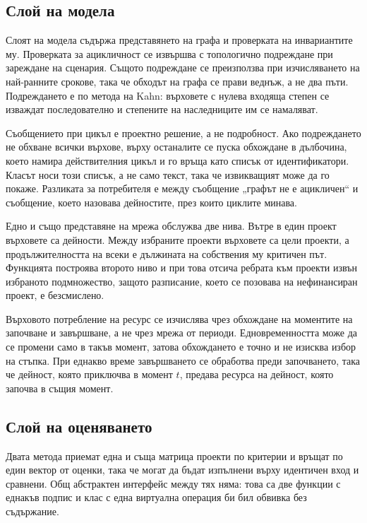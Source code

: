\subsection{Слой на модела}

Слоят на модела съдържа представянето на графа и проверката на инвариантите му.
Проверката за ацикличност се извършва с топологично подреждане при зареждане на
сценария. Същото подреждане се преизползва при изчисляването на най-ранните
срокове, така че обходът на графа се прави веднъж, а не два пъти. Подреждането е
по метода на Kahn: върховете с нулева входяща степен се изваждат последователно и
степените на наследниците им се намаляват.

Съобщението при цикъл е проектно решение, а не подробност. Ако подреждането не
обхване всички върхове, върху останалите се пуска обхождане в дълбочина, което
намира действителния цикъл и го връща като списък от идентификатори. Класът
 носи този списък, а не само текст, така че извикващият
може да го покаже. Разликата за потребителя е между съобщение „графът не е
ацикличен“ и съобщение, което назовава дейностите, през които циклите минава.

Едно и също представяне на мрежа обслужва две нива. Вътре в един проект върховете
са дейности. Между избраните проекти върховете са цели проекти, а
продължителността на всеки е дължината на собствения му критичен път. Функцията
 построява второто ниво и при това отсича ребрата
към проекти извън избраното подмножество, защото разписание, което се позовава на
нефинансиран проект, е безсмислено.

Върховото потребление на ресурс се изчислява чрез обхождане на моментите на
започване и завършване, а не чрез мрежа от периоди. Едновременността може да се
промени само в такъв момент, затова обхождането е точно и не изисква избор на
стъпка. При еднакво време завършването се обработва преди започването, така че
дейност, която приключва в момент $t$, предава ресурса на дейност, която
започва в същия момент.

\subsection{Слой на оценяването}

Двата метода приемат една и съща матрица проекти по критерии и връщат по един
вектор от оценки, така че могат да бъдат изпълнени върху идентичен вход и
сравнени. Общ абстрактен интерфейс между тях няма: това са две функции с еднакъв
подпис и клас с една виртуална операция би бил обвивка без съдържание.

